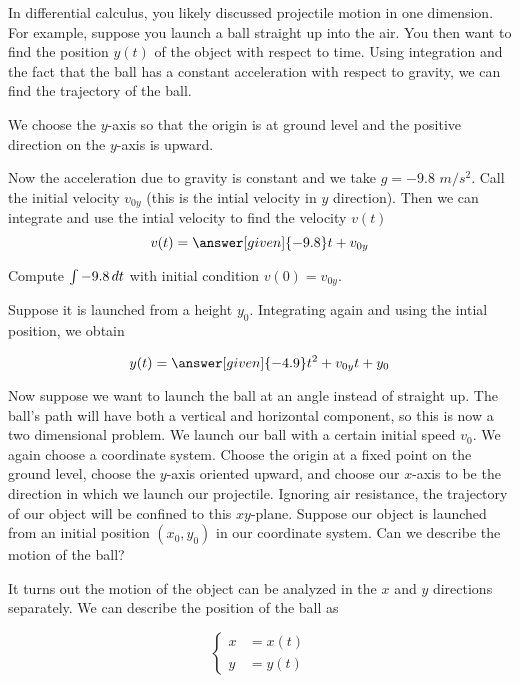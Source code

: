 \documentclass{ximera}
\begin{document}
\begin{example}

 In differential calculus, you likely discussed projectile motion in one dimension. For example, suppose you launch a ball straight up into the air. You then want to find the position
$y(t)$ of the object with respect to time. Using integration and the fact that the ball has a constant acceleration with respect to gravity, we can find the trajectory of the ball.

\begin{explanation}
We choose the $y$-axis so that the origin is at ground level and the positive direction on the $y$-axis is upward.

Now the acceleration due to gravity is constant and we take $g=-9.8$ $m/s^2$. Call the initial velocity $v_{0y}$ (this is the intial velocity in $y$ direction). Then we can integrate and use the intial velocity to find the velocity $v(t)$
\[
v(t)=\answer[given]{-9.8}t+v_{0y}
\]

\begin{hint}
Compute $\int -9.8 \mathop{}\!d t$ with initial condition $v(0)=v_{0y}$.
\end{hint}

Suppose it is launched from a height $y_{0}$. Integrating again and using the intial position, we obtain

\[
y(t)=\answer[given]{-4.9}t^2+v_{0y}t+ y_{0}
\]

\end{explanation}

Now suppose we want to launch the ball at an angle instead of straight up.  The ball's path will have both a vertical and horizontal component, so this is now a two dimensional problem. We launch our ball with a certain initial speed $v_{0}$. We again choose a coordinate system. Choose the origin at a fixed point on the ground level, choose the $y$-axis oriented upward, and choose our $x$-axis to be the direction in which we launch our projectile. Ignoring air resistance, the trajectory of our object will be confined to this $xy$-plane. Suppose our object is launched from an initial position $(x_{0},y_{0})$ in our coordinate system.  Can we describe the motion of the ball?

\begin{explanation}

It turns out the motion of the object can be analyzed in the $x$ and $y$ directions separately.  We can describe the position of the ball as

\[
\begin{cases}
x&=x(t) \\
y&=y(t)
\end{cases}
\]


\end{explanation}
\end{example}
\end{document}
